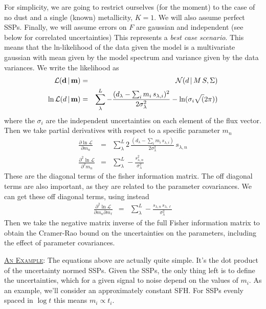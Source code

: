 \documentclass{article}
\begin{document}
For simplicity, we are going to restrict ourselves (for the moment) to the case of no dust and a single (known) metallicity, $K=1$.
We will also assume perfect SSPs.
Finally, we will assume errors on $F$ are gaussian and independent (see below for correlated uncertainties)
This represents a \emph{best case scenario}.
This means that the ln-likelihood of the data given the model is a multivariate
gaussian with mean given by the model spectrum and variance given by the data variances.
We write the likelihood as
\begin{eqnarray}
\mathcal{L}({\bf d} \,|\, {\bf m}) & = & \mathcal{N}(d \,|\, M \, S, \Sigma) \\
 \ln \mathcal{L}(d \,|\, {\bf m}) & = & \sum^L_\lambda -\frac{(d_\lambda - \sum_i m_i \, s_{\lambda, i})^2}
                                                      {2 \sigma_\lambda^2} - \ln(\sigma_i\sqrt(2\pi))
\end{eqnarray}
where the $\sigma_i$ are the independent uncertainties on each element of the flux vector.
Then we take partial derivatives with respect to a specific parameter $m_n$
\begin{eqnarray}
\frac{\partial \ln \mathcal{L}}{\partial m_n} & = & \sum^L_\lambda  2 \, \frac{(d_\lambda - \sum_i m_i \, s_{\lambda, i})}{2 \sigma_\lambda^2} \, s_{\lambda, n} \\
\frac{\partial^2 \ln \mathcal{L}}{\partial^2 m_n} & = & \sum^L_\lambda -\frac{s_{\lambda, n}^2}{\sigma_\lambda^2} 
\end{eqnarray}
These are the diagonal terms of the fisher information matrix.  The off diagonal terms are also important, as they are related to the parameter covariances. We can get these off diagonal terms, using instead
\begin{eqnarray}
\frac{\partial^2 \ln \mathcal{L}}{\partial m_n \partial m_\ell} & = & \sum^L_\lambda -\frac{s_{\lambda, n}\, s_{\lambda, \ell}}{\sigma_\lambda^2} 
\end{eqnarray}
Then we take the negative matrix inverse of the full Fisher information matrix to obtain the Cramer-Rao bound on the uncertainties on the parameters, including the effect of parameter covariances.


\underline{\textsc{An Example}}:  
The equations above are actually quite simple.  
It's the dot product of the uncertainty normed SSPs. 
Given the SSPs, the only thing left is to define the uncertainties, which for a given signal to noise depend on the values of $m_i$.  
As an example, we'll consider an approximately constant SFH.  For SSPs evenly spaced in $\log t$ this means $m_i \propto t_i$.
\end{document}
